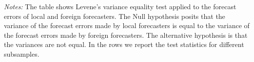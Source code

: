 \begin{table}[H]
{\begin{tabularx}{\linewidth}{llCCCCCC}
\end{tabularx}
\begin{flushleft}
\footnotesize \begin{minipage}{1\textwidth} \vspace{-10pt} \begin{tabnote} \textit{Notes:} The table shows Levene's variance equality test applied to the forecast errors of local and foreign forecasters. The Null hypothesis posits that the variance of the forecast errors made by local forecasters is equal to the  variance of the forecast errors made by foreign forecasters. The alternative hypothesis is that the variances are not equal. In the rows we report the test statistics for different subsamples. \end{tabnote} \end{minipage}  
\end{flushleft}
}
\end{table}
